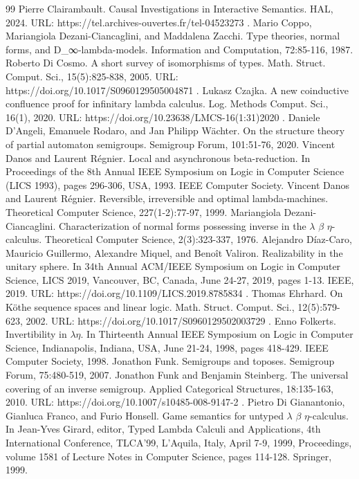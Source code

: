 \begin{thebibliography}{99}
 Pierre Clairambault. Causal Investigations in Interactive Semantics. HAL, 2024. URL: https://tel.archives-ouvertes.fr/tel-04523273 .
 Mario Coppo, Mariangiola Dezani-Ciancaglini, and Maddalena Zacchi. Type theories, normal forms, and D\_∞-lambda-models. Information and Computation, 72:85-116, 1987.
 Roberto Di Cosmo. A short survey of isomorphisms of types. Math. Struct. Comput. Sci., 15(5):825-838, 2005. URL: https://doi.org/10.1017/S0960129505004871 .
 Lukasz Czajka. A new coinductive confluence proof for infinitary lambda calculus. Log. Methods Comput. Sci., 16(1), 2020. URL: https://doi.org/10.23638/LMCS-16(1:31)2020 .
 Daniele D'Angeli, Emanuele Rodaro, and Jan Philipp Wächter. On the structure theory of partial automaton semigroups. Semigroup Forum, 101:51-76, 2020.
 Vincent Danos and Laurent Régnier. Local and asynchronous beta-reduction. In Proceedings of the 8th Annual IEEE Symposium on Logic in Computer Science (LICS 1993), pages 296-306, USA, 1993. IEEE Computer Society.
 Vincent Danos and Laurent Régnier. Reversible, irreversible and optimal lambda-machines. Theoretical Computer Science, 227(1-2):77-97, 1999.
 Mariangiola Dezani-Ciancaglini. Characterization of normal forms possessing inverse in the \ensuremath{\lambda} \ensuremath{\beta} \ensuremath{\eta}-calculus. Theoretical Computer Science, 2(3):323-337, 1976.
 Alejandro Díaz-Caro, Mauricio Guillermo, Alexandre Miquel, and Benoît Valiron. Realizability in the unitary sphere. In 34th Annual ACM/IEEE Symposium on Logic in Computer Science, LICS 2019, Vancouver, BC, Canada, June 24-27, 2019, pages 1-13. IEEE, 2019. URL: https://doi.org/10.1109/LICS.2019.8785834 .
 Thomas Ehrhard. On Köthe sequence spaces and linear logic. Math. Struct. Comput. Sci., 12(5):579-623, 2002. URL: https://doi.org/10.1017/S0960129502003729 .
 Enno Folkerts. Invertibility in \ensuremath{\lambda}\ensuremath{\eta}. In Thirteenth Annual IEEE Symposium on Logic in Computer Science, Indianapolis, Indiana, USA, June 21-24, 1998, pages 418-429. IEEE Computer Society, 1998.
 Jonathon Funk. Semigroups and toposes. Semigroup Forum, 75:480-519, 2007.
 Jonathon Funk and Benjamin Steinberg. The universal covering of an inverse semigroup. Applied Categorical Structures, 18:135-163, 2010. URL: https://doi.org/10.1007/s10485-008-9147-2 .
 Pietro Di Gianantonio, Gianluca Franco, and Furio Honsell. Game semantics for untyped \ensuremath{\lambda} \ensuremath{\beta} \ensuremath{\eta}-calculus. In Jean-Yves Girard, editor, Typed Lambda Calculi and Applications, 4th International Conference, TLCA'99, L'Aquila, Italy, April 7-9, 1999, Proceedings, volume 1581 of Lecture Notes in Computer Science, pages 114-128. Springer, 1999.

\end{thebibliography}
